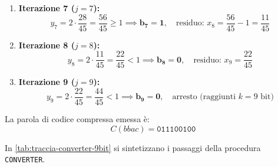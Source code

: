 \begin{enumerate}
\begin{equation}
  \end{equation}
  \item \textbf{Iterazione 7 ($j = 7$):}
  \begin{equation}
    y_7 = 2 \cdot \frac{28}{45} = \frac{56}{45} \ge 1 \implies \mathbf{b_7 = 1}, \quad \text{residuo: } x_8 = \frac{56}{45} - 1 = \frac{11}{45}
  \end{equation}
  \item \textbf{Iterazione 8 ($j = 8$):}
  \begin{equation}
    y_8 = 2 \cdot \frac{11}{45} = \frac{22}{45} < 1 \implies \mathbf{b_8 = 0}, \quad \text{residuo: } x_9 = \frac{22}{45}
  \end{equation}
  \item \textbf{Iterazione 9 ($j = 9$):}
  \begin{equation}
    y_9 = 2 \cdot \frac{22}{45} = \frac{44}{45} < 1 \implies \mathbf{b_9 = 0}, \quad \text{arresto (raggiunti } k = 9 \text{ bit)}
  \end{equation}
\end{enumerate}

La parola di codice compressa emessa \`e:
\begin{equation}
  C(bbac) = \texttt{011100100}
\end{equation}

In \autoref{tab:traccia-converter-9bit} si sintetizzano i passaggi della procedura \texttt{CONVERTER}.

